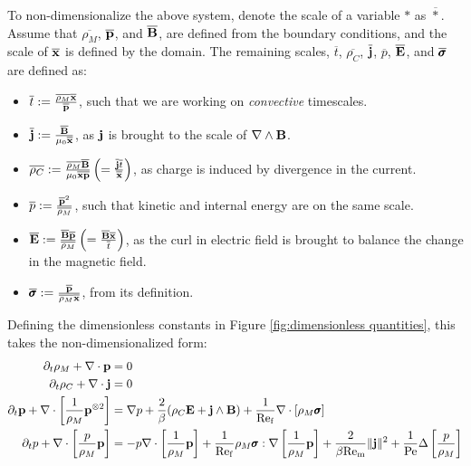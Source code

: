     To non-dimensionalize the above system, denote the scale of a variable $*$ as $\overline{*}$. Assume that $\overline{\rho_{M}}$, $\overline{\mathbf{p}}$, and $\overline{\mathbf{B}}$, are defined from the boundary conditions, and the scale of $\overline{\mathbf{x}}$ is defined by the domain. The remaining scales, $\overline{t}$, $\overline{\rho_{C}}$, $\overline{\mathbf{j}}$, $\overline{p}$, $\overline{\mathbf{E}}$, and $\overline{\pmb{\mathsf{\sigma}}}$ are defined as:  
    \begin{itemize}
        \item  $\overline{t}  :=  \frac{\overline{\rho_{M}}\overline{\mathbf{x}}}{\overline{\mathbf{p}}}$, such that we are working on \emph{convective} timescales.
        \item  $\overline{\mathbf{j}}  :=  \frac{\overline{\mathbf{B}}}{\mu_{0}\overline{\mathbf{x}}}$, as $\mathbf{j}$ is brought to the scale of $\nabla\wedge\mathbf{B}$.
        \item  $\overline{\rho_{C}}  :=  \frac{\overline{\rho_{M}}\overline{\mathbf{B}}}{\mu_{0}\overline{\mathbf{x}}\overline{\mathbf{p}}}  \left(=  \frac{\overline{\mathbf{j}}\overline{t}}{\overline{\mathbf{x}}}\right)$, as charge is induced by divergence in the current.
        \item  $\overline{p}  :=  \frac{\overline{\mathbf{p}}^{2}}{\overline{\rho_{M}}}$, such that kinetic and internal energy are on the same scale.
        \item  $\overline{\mathbf{E}}  :=  \frac{\overline{\mathbf{B}}\overline{\mathbf{p}}}{\overline{\rho_{M}}}  \left(=  \frac{\overline{\mathbf{B}}\overline{\mathbf{x}}}{\overline{t}}\right)$, as the curl in electric field is brought to balance the change in the magnetic field.
        \item  $\overline{\pmb{\mathsf{\sigma}}}  :=  \frac{\overline{\mathbf{p}}}{\overline{\rho_{M}}\overline{\mathbf{x}}}$, from its definition.
    \end{itemize}
    Defining the dimensionless constants in Figure \ref{fig:dimensionless quantities}, this takes the non-dimensionalized form:
    {\small \begin{align}
        \partial_{t}\rho_{M} + \nabla\cdot\mathbf{p}  &=  0  \\
        \partial_{t}\rho_{C} + \nabla\cdot\mathbf{j}  &=  0  \\
        \partial_{t}\mathbf{p} + \nabla\cdot\left[\frac{1}{\rho_{M}}\mathbf{p}^{\otimes 2}\right]  &=  \nabla p + \frac{2}{\beta}(\rho_{C}\mathbf{E} + \mathbf{j}\wedge\mathbf{B}) + \frac{1}{\mathrm{Re}_{\mathrm{f}}}\nabla\cdot[\rho_{M}\pmb{\mathsf{\sigma}}]  \\
        \partial_{t}p + \nabla\cdot\left[\frac{p}{\rho_{M}}\mathbf{p}\right]  &=  - p\nabla\cdot\left[\frac{1}{\rho_{M}}\mathbf{p}\right] + \frac{1}{\mathrm{Re}_{\mathrm{f}}}\rho_{M}\pmb{\mathsf{\sigma}}:\nabla\left[\frac{1}{\rho_{M}}\mathbf{p}\right] + \frac{2}{\beta\mathrm{Re}_{\mathrm{m}}}\|\mathbf{j}\|^{2} + \frac{1}{\mathrm{Pe}}\Delta\left[\frac{p}{\rho_{M}}\right]
    \end{align}}
